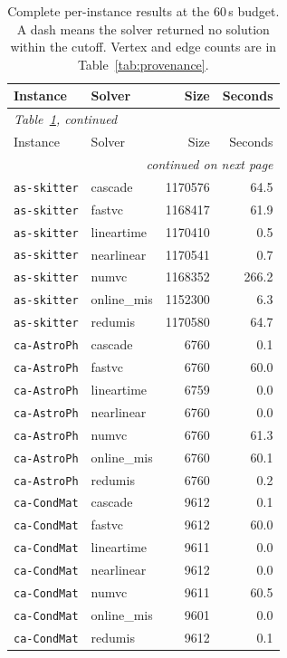 \footnotesize
\begin{longtable}{l l r r}
\caption{Complete per-instance results at the 60\,s budget. A dash means the solver returned no solution within the cutoff. Vertex and edge counts are in Table~\ref{tab:provenance}.}\label{tab:appendix}\\
\toprule
Instance & Solver & Size & Seconds \\
\midrule
\endfirsthead
\multicolumn{4}{l}{\itshape Table~\ref{tab:appendix}, continued}\\
\toprule
Instance & Solver & Size & Seconds \\
\midrule
\endhead
\midrule \multicolumn{4}{r}{\itshape continued on next page}\\
\endfoot
\bottomrule
\endlastfoot
\texttt{as-skitter} & cascade & 1170576 & 64.5 \\
\texttt{as-skitter} & fastvc & 1168417 & 61.9 \\
\texttt{as-skitter} & lineartime & 1170410 & 0.5 \\
\texttt{as-skitter} & nearlinear & 1170541 & 0.7 \\
\texttt{as-skitter} & numvc & 1168352 & 266.2 \\
\texttt{as-skitter} & online\_mis & 1152300 & 6.3 \\
\texttt{as-skitter} & redumis & 1170580 & 64.7 \\
\texttt{ca-AstroPh} & cascade & 6760 & 0.1 \\
\texttt{ca-AstroPh} & fastvc & 6760 & 60.0 \\
\texttt{ca-AstroPh} & lineartime & 6759 & 0.0 \\
\texttt{ca-AstroPh} & nearlinear & 6760 & 0.0 \\
\texttt{ca-AstroPh} & numvc & 6760 & 61.3 \\
\texttt{ca-AstroPh} & online\_mis & 6760 & 60.1 \\
\texttt{ca-AstroPh} & redumis & 6760 & 0.2 \\
\texttt{ca-CondMat} & cascade & 9612 & 0.1 \\
\texttt{ca-CondMat} & fastvc & 9612 & 60.0 \\
\texttt{ca-CondMat} & lineartime & 9611 & 0.0 \\
\texttt{ca-CondMat} & nearlinear & 9612 & 0.0 \\
\texttt{ca-CondMat} & numvc & 9611 & 60.5 \\
\texttt{ca-CondMat} & online\_mis & 9601 & 0.0 \\
\texttt{ca-CondMat} & redumis & 9612 & 0.1 \\

\end{longtable}
